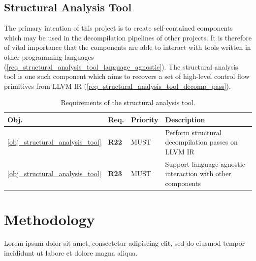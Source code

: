 \documentclass[12pt, a4paper]{article}
\makeatletter
\newcommand{\customlabel}[2]{
	\hypertarget{#1}{#2}
	\protected@write \@auxout {}{\string \newlabel {#1}{{#2}{\thepage}{#2}{#1}{}} }
}
\makeatother
\begin{document}

\subsection{Structural Analysis Tool}

The primary intention of this project is to create self-contained components which may be used in the decompilation pipelines of other projects. It is therefore of vital importance that the components are able to interact with tools written in other programming languages (\ref{req_structural_analysis_tool_language_agnostic}). The structural analysis tool is one such component which aims to recovers a set of high-level control flow primitives from LLVM IR (\ref{req_structural_analysis_tool_decomp_pass}).

\begin{table}[htbp]
	\begin{center}
		\begin{tabular}{|l|l|l|l|}
			\hline
			Obj. & Req. & Priority & Description \\
			\hline
			\ref{obj_structural_analysis_tool} & \customlabel{req_structural_analysis_tool_decomp_pass}{\textbf{R22}} & MUST & Perform structural decompilation passes on LLVM IR \\
			\ref{obj_structural_analysis_tool} & \customlabel{req_structural_analysis_tool_language_agnostic}{\textbf{R23}} & MUST & Support language-agnostic interaction with other components \\
			\hline
		\end{tabular}
	\end{center}
	\caption{Requirements of the structural analysis tool.}
\end{table}

\pagebreak


\section{Methodology}

Lorem ipsum dolor sit amet, consectetur adipiscing elit, sed do eiusmod tempor incididunt ut labore et dolore magna aliqua.

\end{document}

